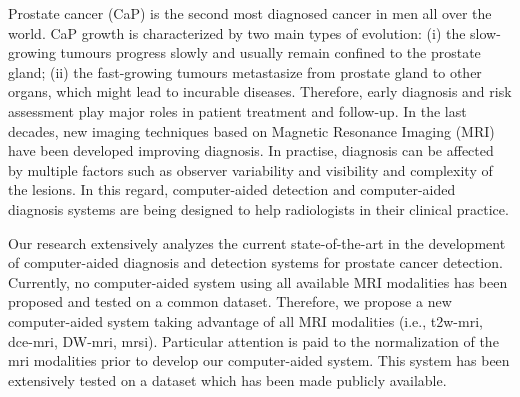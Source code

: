 


\begin{abstracts}        %
Prostate cancer (CaP) is the second most diagnosed cancer in men all over the world.
CaP growth is characterized by two main types of evolution: (i) the slow-growing tumours progress slowly and usually remain confined to the prostate gland; (ii) the fast-growing tumours metastasize from prostate gland to other organs, which might lead to incurable diseases.
Therefore, early diagnosis and risk assessment play major roles in patient treatment and follow-up.
In the last decades, new imaging techniques based on Magnetic Resonance Imaging (MRI) have been developed improving diagnosis.
In practise, diagnosis can be affected by multiple factors such as observer variability and visibility and complexity of the lesions.
In this regard, computer-aided detection and computer-aided diagnosis systems are being designed to help radiologists in their clinical practice.

Our research extensively analyzes the current state-of-the-art in the development of computer-aided diagnosis and detection systems for prostate cancer detection.
Currently, no computer-aided system using all available MRI modalities has been proposed and tested on a common dataset.
Therefore, we propose a new computer-aided system taking advantage of all MRI modalities (i.e., \acs{t2w}-\acs{mri}, \acs{dce}-\acs{mri}, DW-\acs{mri}, \acs{mrsi}).
Particular attention is paid to the normalization of the \acs{mri} modalities prior to develop our computer-aided system.
This system has been extensively tested on a dataset which has been made publicly available.
\end{abstracts}

